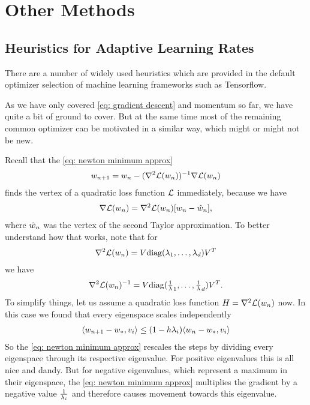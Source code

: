 \chapter{Other Methods}\label{chap: other methods}


\section{Heuristics for Adaptive Learning Rates}
\label{sec: heuristics for adpative learning rates}

There are a number of widely used heuristics which are provided in the
default optimizer selection of machine learning frameworks such as Tensorflow.

As we have only covered \ref{eq: gradient descent} and momentum so far, we have
quite a bit of ground to cover. But at the same time most of the remaining
common optimizer \parencite[as reviewed by e.g.][]{ruderOverviewGradientDescent2017}
can be motivated in a similar way, which might or might not be new.

Recall that the \ref{eq: newton minimum approx}
\begin{align*}
	w_{n+1}	= w_n - (\nabla^2\mathcal{L}(w_n))^{-1}\nabla\mathcal{L}(w_n)
\end{align*}
finds the vertex of a quadratic loss function \(\mathcal{L}\) immediately, because we
have
\begin{align*}
	\nabla\mathcal{L}(w_n) = \nabla^2\mathcal{L}(w_n)[w_n - \hat{w}_n],
\end{align*}
where \(\hat{w}_n\) was the vertex of the second Taylor approximation.
To better understand how that works, note that for
\begin{align*}
	\nabla^2\mathcal{L}(w_n) = V \text{diag}(\lambda_1,\dots,\lambda_d)V^T
\end{align*}
we have
\begin{align*}
	\nabla^2\mathcal{L}(w_n)^{-1}
	= V \text{diag}(\tfrac1{\lambda}_1,\dots,\tfrac1{\lambda}_d)V^T.
\end{align*}
To simplify things, let us assume a quadratic loss function
\(H=\nabla^2\mathcal{L}(w_n)\) now.  In this case we found that every
eigenspace scales independently
\begin{align*}
	\langle w_{n+1} - w_*, v_i \rangle
	\le (1-h \lambda_i)\langle w_n - w_*, v_i \rangle
\end{align*}
So the \ref{eq: newton minimum approx} rescales the steps by dividing every
eigenspace through its respective eigenvalue. For positive eigenvalues this is
all nice and dandy. But for negative eigenvalues, which represent a maximum in
their eigenspace, the \ref{eq: newton minimum approx} multiplies the gradient by
a negative value \(\tfrac1{\lambda_i}\) and therefore causes movement towards
this eigenvalue.

